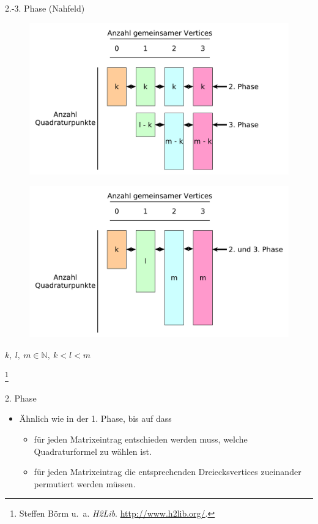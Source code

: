 \documentclass[10pt]{beamer}
\let\svthefootnote\thefootnote
\begin{document}
\begin{frame}{2.-3. Phase (Nahfeld)}
  \begin{overprint}
      \begin{figure}
        \centering
        \includegraphics[width=.9\linewidth]{figures/fg-nf-quad-points-div.pdf}
      \end{figure}
      \begin{figure}
        \centering
        \includegraphics[width=.9\linewidth]{figures/fg-nf-quad-points.pdf}
      \end{figure}
  \end{overprint}

  \centerline{\( k, \ l, \ m \in \mathbb{N}, \ k < l < m\)}

  \footnotesize
  \let\thefootnote\relax\footnote{Steffen Börm u.\ a. \textit{H2Lib}.
  \url{http://www.h2lib.org/}.}
  \addtocounter{footnote}{-1}\let\thefootnote\svthefootnote\relax
  \normalsize
\end{frame}

\begin{frame}{2. Phase}
  \begin{itemize}
    \item \"Ahnlich wie in der 1. Phase, bis auf dass
    \begin{itemize}
      \item f\"ur jeden Matrixeintrag entschieden werden muss, welche
            Quadraturformel zu wählen ist.
      \item f\"ur jeden Matrixeintrag die entsprechenden Dreiecksvertices
            zueinander permutiert werden müssen.
    \end{itemize}
  \end{itemize}
\end{frame}
\end{document}
